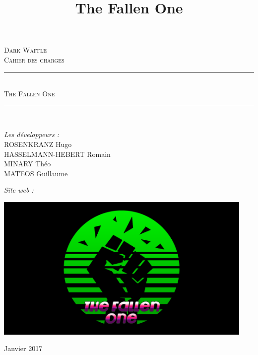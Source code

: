 \documentclass[14pt]{extarticle}
\title{The Fallen One}
\newcommand{\HRule}{\rule{\linewidth}{0.5mm}}
\begin{document}
\begin{titlepage}
  \begin{sffamily}
  \begin{center}

    \textsc{\LARGE Dark Waffle}\\[2cm]

    \textsc{\Large Cahier des charges}\\[1.5cm]

    \HRule \\[0.4cm]
    { \huge \rmfamily \scshape {The Fallen One}\\[0.4cm] }

    \HRule \\[2cm]

    \begin{minipage}{0.6\textwidth}
      \begin{flushleft} \large
      \emph{Les développeurs :}\\
		ROSENKRANZ Hugo\\
		HASSELMANN-HEBERT Romain\\
        MINARY Théo\\
		MATEOS Guillaume\\
      \end{flushleft}
    \end{minipage}
    \begin{minipage}{0.3\textwidth}
      \begin{flushright} \large
        \emph{Site web :}\\
        {\selectfont {}}
      \end{flushright}
    \end{minipage}
    \vspace{2cm}
	\begin{center}
    \includegraphics[height=200pt]{logo_jeu.png}
    \end{center}
    \vfill
    
    {\large Janvier 2017}

  \end{center}
  \end{sffamily}
\end{titlepage}
\end{document}
